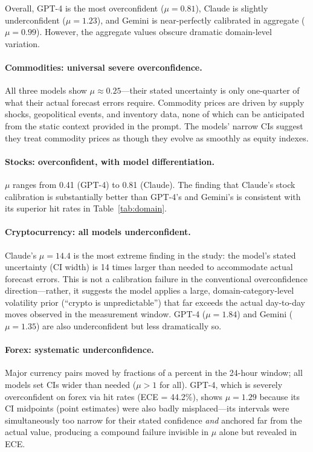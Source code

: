 \documentclass[9pt,twoside,lineno]{pnas-new}
\begin{document}
Overall, GPT-4 is the most overconfident ($\mu = 0.81$), Claude is slightly underconfident ($\mu = 1.23$), and Gemini is near-perfectly calibrated in aggregate ($\mu = 0.99$). However, the aggregate values obscure dramatic domain-level variation.

\paragraph{Commodities: universal severe overconfidence.} All three models show $\mu \approx 0.25$---their stated uncertainty is only one-quarter of what their actual forecast errors require. Commodity prices are driven by supply shocks, geopolitical events, and inventory data, none of which can be anticipated from the static context provided in the prompt. The models' narrow CIs suggest they treat commodity prices as though they evolve as smoothly as equity indexes.

\paragraph{Stocks: overconfident, with model differentiation.} $\mu$ ranges from 0.41 (GPT-4) to 0.81 (Claude). The finding that Claude's stock calibration is substantially better than GPT-4's and Gemini's is consistent with its superior hit rates in Table~\ref{tab:domain}.

\paragraph{Cryptocurrency: all models underconfident.} Claude's $\mu = 14.4$ is the most extreme finding in the study: the model's stated uncertainty (CI width) is 14 times larger than needed to accommodate actual forecast errors. This is not a calibration failure in the conventional overconfidence direction---rather, it suggests the model applies a large, domain-category-level volatility prior (``crypto is unpredictable'') that far exceeds the actual day-to-day moves observed in the measurement window. GPT-4 ($\mu = 1.84$) and Gemini ($\mu = 1.35$) are also underconfident but less dramatically so.

\paragraph{Forex: systematic underconfidence.} Major currency pairs moved by fractions of a percent in the 24-hour window; all models set CIs wider than needed ($\mu > 1$ for all). GPT-4, which is severely overconfident on forex via hit rates (ECE = 44.2\%), shows $\mu = 1.29$ because its CI midpoints (point estimates) were also badly misplaced---its intervals were simultaneously too narrow for their stated confidence \textit{and} anchored far from the actual value, producing a compound failure invisible in $\mu$ alone but revealed in ECE.
\end{document}
